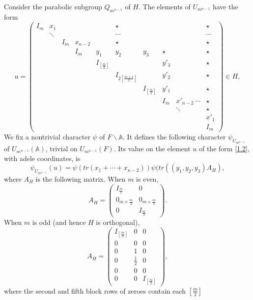 \documentclass[12pts]{amsart}
\newcommand{\BA}{{\mathbb {A}}}
\begin{document}
Consider the parabolic subgroup $Q_{m^{n-1}}$ of $H$. The elements of $U_{m^{n-1}}$ have the form
\begin{equation}\label{1.2}
u=\begin{pmatrix}I_m&x_1&&&&\star&&&&\star\\&\ddots&&&&\cdots&&&&\cdots\\&&I_m&x_{n-2}&&\star&&&&\star\\
&&&I_m&y_1&y_2&y_3&\star&&\star\\&&&&I_{[\frac{m}{2}]}&&&y'_3&&\star\\&&&&&I_{2[\frac{m+1}{2}]}&&y'_2&&\star\\
&&&&&&I_{[\frac{m}{2}]}&y'_1&&\star\\&&&&&&&I_m&x'_{n-2}\
\cdots&\star\\&&&&&&&&\ddots&\star\\&&&&&&&&&x'_1\\&&&&&&&&&I_m\end{pmatrix}\in H,
\end{equation}
We fix a nontrivial character
$\psi$ of $F\backslash \BA$. It defines the following character
$\psi_{U_{m^{n-1}}}$ of $U_{m^{n-1}}(\BA)$, trivial on
$U_{m^{n-1}}(F)$. Its value on the element $u$ of the form
\eqref{1.2}, with adele coordinates, is
\begin{equation}\label{1.3}
\psi_{U_{m^{n-1}}}(u)=\psi(tr(x_1+\cdots+x_{n-2}))\psi(tr((y_1,y_2,y_3)A_H),
\end{equation}
where $A_H$ is the following matrix. When $m$ is even,
\begin{equation}\label{1.4}
A_H=\begin{pmatrix}I_{\frac{m}{2}}&0\\0_{m\times \frac{m}{2}}&0_{m\times \frac{m}{2}}\\0&I_{\frac{m}{2}}\end{pmatrix}.
\end{equation}
When $m$ is odd (and hence $H$ is orthogonal),
\begin{equation}\label{1.5}
A_H=\begin{pmatrix}I_{[\frac{m}{2}]}&0&0\\0&0&0\\0&1&0\\0&\frac{1}{2}&0\\0&0&0\\0&0&I_{[\frac{m}{2}]}\end{pmatrix},
\end{equation}
where the second and fifth block rows of zeroes contain each $[\frac{m}{2}]$
\end{document}
